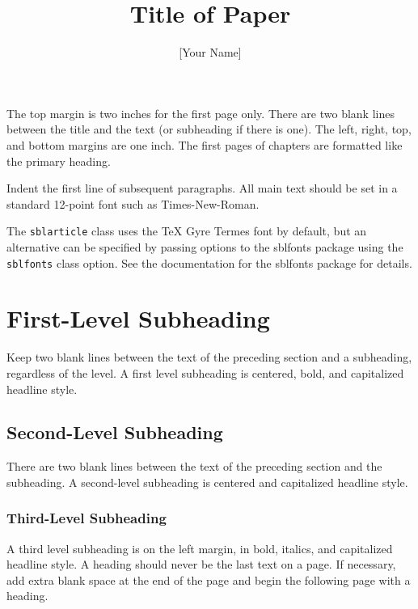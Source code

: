\documentclass{sblarticle}
\begin{document}
\title{Title of Paper}
\author{[Your Name]}
\maketitle


The top margin is two inches for the first page only. There are two blank
lines between the title and the text (or subheading if there is one). The
left, right, top, and bottom margins are one inch. The first pages of chapters
are formatted like the primary heading.

Indent the first line of subsequent paragraphs. All main text should be set in
a standard 12-point font such as Times-New-Roman.

The \texttt{sblarticle} class uses the TeX Gyre Termes font by default, but an
alternative can be specified by passing options to the \textsf{sblfonts}
package using the \texttt{sblfonts} class option. See the documentation for
the \textsf{sblfonts} package for details.

\section[First-level subheading (indent three spaces, no dots); titles that
exceed one line must also be indented for subsequent lines]{First-Level
Subheading}

Keep two blank lines between the text of the preceding section and a
subheading, regardless of the level. A first level subheading is centered,
bold, and capitalized headline style.

\subsection[Second-level subheadings (indent three spaces, no
dots)]{Second-Level Subheading}

There are two blank lines between the text of the preceding section and the
subheading. A second-level subheading is centered and capitalized headline
style.

\subsubsection{Third-Level Subheading}

A third level subheading is on the left margin, in bold, italics, and
capitalized headline style. A heading should never be the last text on a page.
If necessary, add extra blank space at the end of the page and begin the
following page with a heading.
\end{document}
